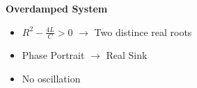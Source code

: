 \documentclass[preview]{standalone}
\begin{document}
\begin{center}
\textbf{Overdamped System}
                    \begin{itemize}
                        \item $R^2 - \frac{4L}{C} > 0$ $\rightarrow$ Two distince real roots
                        \item Phase Portrait $\rightarrow$ Real Sink
                        \item No oscillation
                    \end{itemize}
\end{center}
\end{document}
